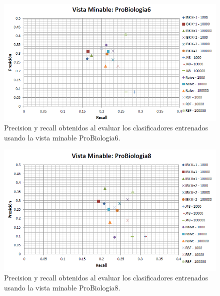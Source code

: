 \documentclass{article}
\begin{document}
\begin{figure}[!htb]
\begin{centering}
\includegraphics[scale=0.8]{probiologia6}
\par\end{centering}
\caption{Precision y recall obtenidos al evaluar los clasificadores entrenados usando la vista minable ProBiologia6.}
\label{fig:figura12}
\end{figure}

\begin{figure}[!htb]
\begin{centering}
\includegraphics[scale=0.8]{probiologia8}
\par\end{centering}
\caption{Precision y recall obtenidos al evaluar los clasificadores entrenados usando la vista minable ProBiologia8.}
\label{fig:figura13}
\end{figure}
\end{document}
